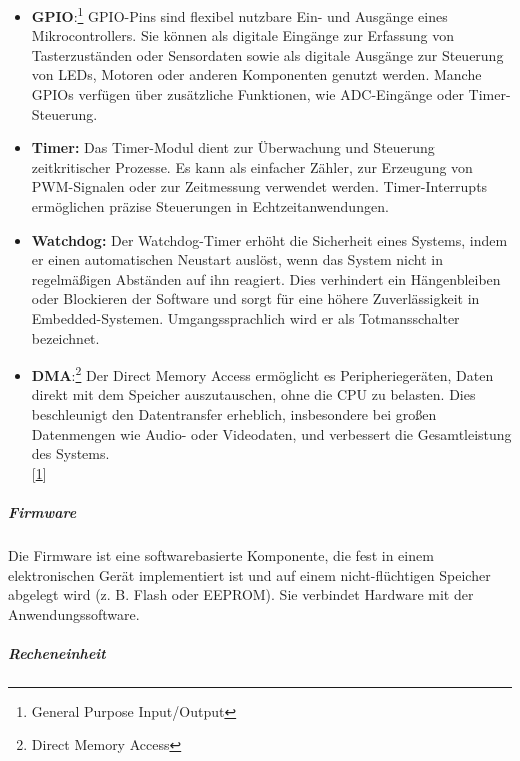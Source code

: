\documentclass[
    headings=optiontotocandhead,%
    twoside,
    numbers=noenddot,%
    12pt, %
    titlepage, %
    parskip=full, %
    listof=leveldown, 
    numbers=noenddot, %
    a4paper,DIV=14,
    BCOR=15mm,
]{scrbook}
\begin{document}
\begin{itemize}
\item
  \textbf{GPIO}:\footnote{General Purpose Input/Output} GPIO-Pins sind
  flexibel nutzbare Ein- und Ausgänge eines Mikrocontrollers. Sie können
  als digitale Eingänge zur Erfassung von Tasterzuständen oder
  Sensordaten sowie als digitale Ausgänge zur Steuerung von LEDs,
  Motoren oder anderen Komponenten genutzt werden. Manche GPIOs verfügen
  über zusätzliche Funktionen, wie ADC-Eingänge oder Timer-Steuerung.
\item
  \textbf{Timer:} Das Timer-Modul dient zur Überwachung und Steuerung
  zeitkritischer Prozesse. Es kann als einfacher Zähler, zur Erzeugung
  von PWM-Signalen oder zur Zeitmessung verwendet werden.
  Timer-Interrupts ermöglichen präzise Steuerungen in
  Echtzeitanwendungen.
\item
  \textbf{Watchdog:} Der Watchdog-Timer erhöht die Sicherheit eines
  Systems, indem er einen automatischen Neustart auslöst, wenn das
  System nicht in regelmäßigen Abständen auf ihn reagiert. Dies
  verhindert ein Hängenbleiben oder Blockieren der Software und sorgt
  für eine höhere Zuverlässigkeit in Embedded-Systemen.
  Umgangssprachlich wird er als Totmansschalter bezeichnet.
\item
  \textbf{DMA}:\footnote{Direct Memory Access} Der Direct Memory Access
  ermöglicht es Peripheriegeräten, Daten direkt mit dem Speicher
  auszutauschen, ohne die CPU zu belasten. Dies beschleunigt den
  Datentransfer erheblich, insbesondere bei großen Datenmengen wie
  Audio- oder Videodaten, und verbessert die Gesamtleistung des
  Systems.\\
  {[}\protect\hyperlink{ref-EmbeddedSystems}{1}{]}
\end{itemize}

\hypertarget{firmware}{%
\subparagraph{Firmware}\label{firmware}}

Die Firmware ist eine softwarebasierte Komponente, die fest in einem
elektronischen Gerät implementiert ist und auf einem nicht-flüchtigen
Speicher abgelegt wird (z. B. Flash oder EEPROM). Sie verbindet Hardware
mit der Anwendungssoftware.

\hypertarget{recheneinheit}{%
\subparagraph{Recheneinheit}\label{recheneinheit}}
\end{document}
